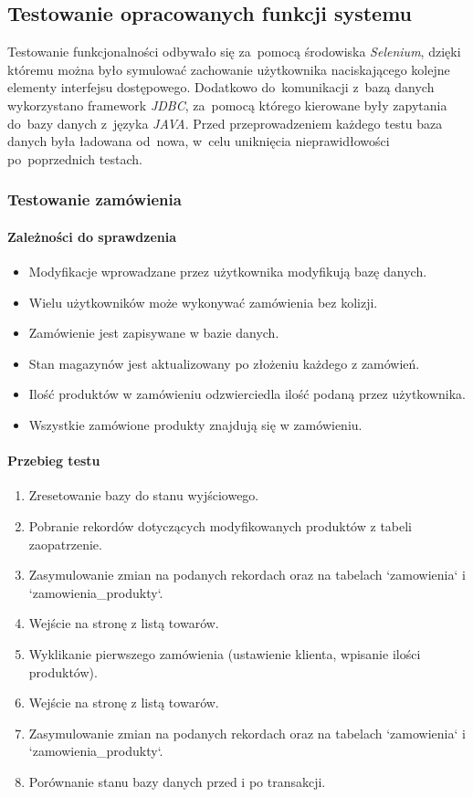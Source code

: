 \documentclass[a4paper, 12pt]{article}
\begin{document}
\subsection{Testowanie opracowanych funkcji systemu}
Testowanie funkcjonalności odbywało się za~pomocą środowiska \textit{Selenium}, dzięki któremu można było symulować zachowanie użytkownika naciskającego kolejne elementy interfejsu dostępowego. Dodatkowo do~komunikacji z~bazą danych wykorzystano framework \textit{JDBC}, za~pomocą którego kierowane były zapytania do~bazy danych z~języka \textit{JAVA}. Przed przeprowadzeniem każdego testu baza danych była ładowana od~nowa, w~celu uniknięcia nieprawidłowości po~poprzednich testach.

\subsubsection{Testowanie zamówienia}
\paragraph{Zależności do sprawdzenia}
\begin{itemize}
\item Modyfikacje wprowadzane przez użytkownika modyfikują bazę danych.
\item Wielu użytkowników może wykonywać zamówienia bez kolizji.
\item Zamówienie jest zapisywane w bazie danych.
\item Stan magazynów jest aktualizowany po złożeniu każdego z zamówień.
\item Ilość produktów w zamówieniu odzwierciedla ilość podaną przez użytkownika.
\item Wszystkie zamówione produkty znajdują się w zamówieniu.
\end{itemize}

\paragraph{Przebieg testu}
\begin{enumerate}
\item Zresetowanie bazy do stanu wyjściowego.
\item Pobranie rekordów dotyczących modyfikowanych produktów z tabeli zaopatrzenie.
\item Zasymulowanie zmian na podanych rekordach oraz na tabelach `zamowienia` i `zamowienia\_produkty`.
\item Wejście na stronę z listą towarów.
\item Wyklikanie pierwszego zamówienia (ustawienie klienta, wpisanie ilości produktów).
\item Wejście na stronę z listą towarów.
\item Zasymulowanie zmian na podanych rekordach oraz na tabelach `zamowienia` i `zamowienia\_produkty`.
\item Porównanie stanu bazy danych przed i po transakcji.
\end{enumerate}
\end{document}
